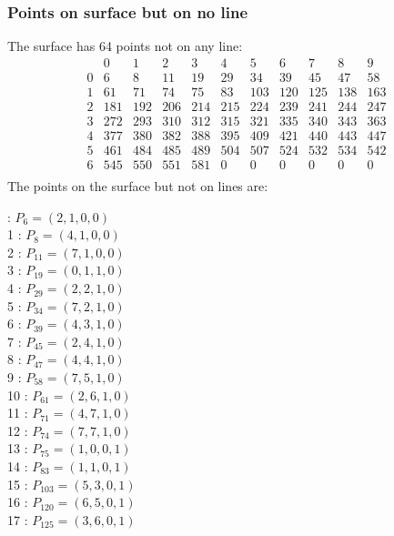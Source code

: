 \documentclass{article}
\begin{document}
{\subsubsection*{Points on surface but on no line}
The surface has 64 points not on any line:\\
$$
\begin{array}{r|*{10}{r}}
 & 0 & 1 & 2 & 3 & 4 & 5 & 6 & 7 & 8 & 9\\
\hline
0 & 6 & 8 & 11 & 19 & 29 & 34 & 39 & 45 & 47 & 58\\
1 & 61 & 71 & 74 & 75 & 83 & 103 & 120 & 125 & 138 & 163\\
2 & 181 & 192 & 206 & 214 & 215 & 224 & 239 & 241 & 244 & 247\\
3 & 272 & 293 & 310 & 312 & 315 & 321 & 335 & 340 & 343 & 363\\
4 & 377 & 380 & 382 & 388 & 395 & 409 & 421 & 440 & 443 & 447\\
5 & 461 & 484 & 485 & 489 & 504 & 507 & 524 & 532 & 534 & 542\\
6 & 545 & 550 & 551 & 581 & 0 & 0 & 0 & 0 & 0 & 0\\
\end{array}
$$
The points on the surface but not on lines are:\\
\begin{multicols}{2}
 : $P_{6}=( 2, 1, 0, 0 )$\\
1 : $P_{8}=( 4, 1, 0, 0 )$\\
2 : $P_{11}=( 7, 1, 0, 0 )$\\
3 : $P_{19}=( 0, 1, 1, 0 )$\\
4 : $P_{29}=( 2, 2, 1, 0 )$\\
5 : $P_{34}=( 7, 2, 1, 0 )$\\
6 : $P_{39}=( 4, 3, 1, 0 )$\\
7 : $P_{45}=( 2, 4, 1, 0 )$\\
8 : $P_{47}=( 4, 4, 1, 0 )$\\
9 : $P_{58}=( 7, 5, 1, 0 )$\\
10 : $P_{61}=( 2, 6, 1, 0 )$\\
11 : $P_{71}=( 4, 7, 1, 0 )$\\
12 : $P_{74}=( 7, 7, 1, 0 )$\\
13 : $P_{75}=( 1, 0, 0, 1 )$\\
14 : $P_{83}=( 1, 1, 0, 1 )$\\
15 : $P_{103}=( 5, 3, 0, 1 )$\\
16 : $P_{120}=( 6, 5, 0, 1 )$\\
17 : $P_{125}=( 3, 6, 0, 1 )$\\

\end{multicols}}
\end{document}
